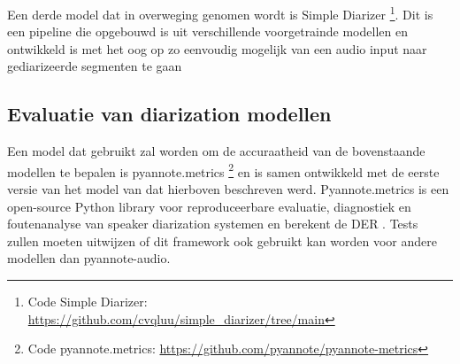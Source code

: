 Een derde model dat in overweging genomen wordt is Simple Diarizer \footnote{Code Simple Diarizer: \url{https://github.com/cvqluu/simple_diarizer/tree/main}}. Dit is een pipeline die opgebouwd is uit verschillende voorgetrainde modellen en ontwikkeld is met het oog op zo eenvoudig mogelijk van een audio input naar gediarizeerde segmenten te gaan \autocite{Chau}

\subsection{Evaluatie van diarization modellen}
Een model dat gebruikt zal worden om de accuraatheid van de bovenstaande modellen te bepalen is pyannote.metrics \footnote{Code pyannote.metrics: \url{https://github.com/pyannote/pyannote-metrics}} en is samen ontwikkeld met de eerste versie van het model van \textcite{Bredin2023} dat hierboven beschreven werd. Pyannote.metrics is een open-source Python library voor reproduceerbare evaluatie, diagnostiek en foutenanalyse van speaker diarization systemen en berekent de DER \autocite{Bredin2017}. Tests zullen moeten uitwijzen of dit framework ook gebruikt kan worden voor andere modellen dan pyannote-audio.